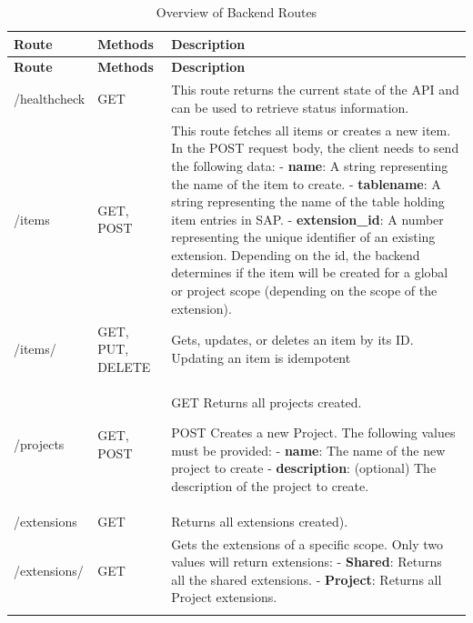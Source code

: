 \begin{longtable}{|l|p{3cm}|>{\raggedright\arraybackslash}p{7cm}|}
    \hline
    \rowcolor{headercolor} \textbf{Route} & \textbf{Methods} & \textbf{Description} \\
    \endfirsthead

    \hline
    \rowcolor{headercolor} \textbf{Route} & \textbf{Methods} & \textbf{Description} \\
    \endhead

    \hline
    /healthcheck & GET & This route returns the current state of the API and can be used to retrieve status information. \\
    \hline
    /items & GET, POST & This route fetches all items or creates a new item.
    In the POST request body, the client needs to send the following data:
    \newline\newline  - \textbf{name}: A string representing the name of the item to create.
    \newline\newline - \textbf{tablename}: A string representing the name of the table holding item entries in SAP.
    \newline\newline - \textbf{extension\_id}: A number representing the unique identifier of an existing extension. Depending on the id, the backend determines if the item will be created for a global or project scope (depending on the scope of the extension). \\
    \hline
    /items/ & GET, PUT, DELETE & Gets, updates, or deletes an item by its ID. Updating an item is idempotent \\
    \hline
    /projects & GET, POST & GET Returns all projects created.

    \newline\newline POST Creates a new Project. The following values must be provided:
    \newline\newline - \textbf{name}: The name of the new project to create
    \newline\newline - \textbf{description}: (optional) The description of the project to create.\\
    \hline
    /extensions & GET & Returns all extensions created). \\
    \hline
    /extensions/ & GET & Gets the extensions of a specific scope.
    Only two values will return extensions:
    \newline\newline - \textbf{Shared}: Returns all the shared extensions.
    \newline\newline - \textbf{Project}: Returns all Project extensions. \\
    \hline
    \caption{Overview of Backend Routes}
    \label{tab:table_routes}
\end{longtable}


